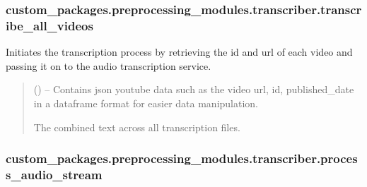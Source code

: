 \documentclass[letterpaper,10pt,english]{sphinxhowto}
\begin{document}
\sphinxstepscope


\subsubsection{custom\_packages.preprocessing\_modules.transcriber.transcribe\_all\_videos}
\label{\detokenize{_autosummary/custom_packages.preprocessing_modules.transcriber.transcribe_all_videos:custom-packages-preprocessing-modules-transcriber-transcribe-all-videos}}\label{\detokenize{_autosummary/custom_packages.preprocessing_modules.transcriber.transcribe_all_videos::doc}}

\begin{fulllineitems}
\label{\detokenize{_autosummary/custom_packages.preprocessing_modules.transcriber.transcribe_all_videos:custom_packages.preprocessing_modules.transcriber.transcribe_all_videos}}
\pysigstartsignatures
\pysiglinewithargsret
{}
{}
{}
\pysigstopsignatures
\sphinxAtStartPar
Initiates the transcription process by retrieving the id and url of each
video and passing it on to the audio transcription service.
\begin{quote}\begin{description}
\sphinxAtStartPar
{} () – Contains json youtube data such as the video url, id, published\_date in
a dataframe format for easier data manipulation.

\sphinxAtStartPar
The combined text across all transcription files.

\sphinxAtStartPar
{}

\end{description}\end{quote}

\end{fulllineitems}


\sphinxstepscope


\subsubsection{custom\_packages.preprocessing\_modules.transcriber.process\_audio\_stream}
\label{\detokenize{_autosummary/custom_packages.preprocessing_modules.transcriber.process_audio_stream:custom-packages-preprocessing-modules-transcriber-process-audio-stream}}\label{\detokenize{_autosummary/custom_packages.preprocessing_modules.transcriber.process_audio_stream::doc}}
\end{document}
